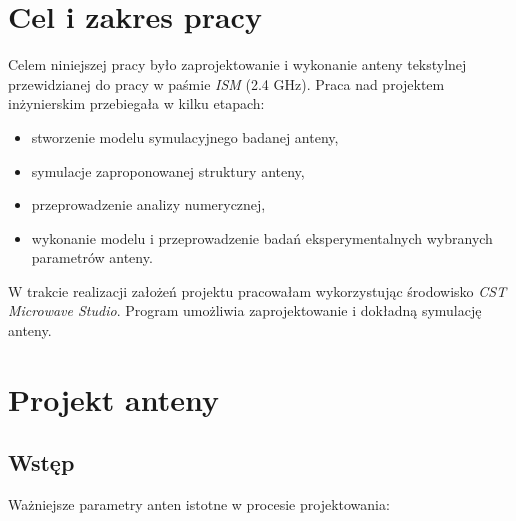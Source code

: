  \chapter{Cel i zakres pracy}

Celem niniejszej pracy było zaprojektowanie i wykonanie anteny tekstylnej przewidzianej do pracy w paśmie \emph{ISM} (2.4 GHz). 
Praca nad projektem inżynierskim przebiegała w kilku etapach:

\begin{itemize}\setlength{\itemsep}{0pt}
	
	\item stworzenie modelu symulacyjnego badanej anteny,

	\item symulacje zaproponowanej struktury anteny,

	\item przeprowadzenie analizy numerycznej,

	\item wykonanie modelu i przeprowadzenie badań eksperymentalnych wybranych parametrów anteny.

\end{itemize}

W trakcie realizacji założeń projektu pracowałam wykorzystując środowisko \emph{CST Microwave Studio}. Program umożliwia zaprojektowanie i dokładną symulację anteny.   



\chapter {Projekt anteny}

\section{Wstęp}

\noindent Ważniejsze parametry anten istotne w procesie projektowania: 

